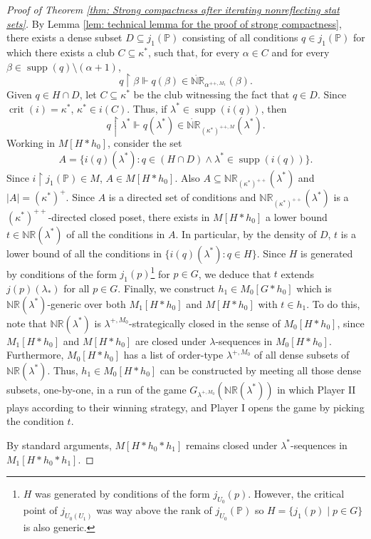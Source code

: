 \documentclass[11pt]{amsart}
\renewcommand{\restriction}{\mathbin\upharpoonright}    %
\theoremstyle{definition}
\newcounter{condition}
\theoremstyle{remark}
\newcommand\<{{<}}
\DeclareMathOperator{\supp}{supp}
\DeclareMathOperator{\crit}{crit}
\newcommand{\po}{\mathbb{P}}
\begin{document}
\begin{proof}[Proof of Theorem \ref{thm: Strong compactness after iterating nonreflecting stat sets}]
By Lemma \ref{lem: technical lemma for the proof of strong compactness}, there exists a dense subset $D\subseteq j_1(\po)$ consisting of all conditions $q\in j_1(\po)$ for which there exists a club $C\subseteq \kappa^*$, such that, for every $\alpha\in C$ and for every $\beta\in \supp(q)\setminus ( \alpha+1 )$,
$$ q\restriction \beta \Vdash q(\beta)\in \dot{\mathbb{NR}}_{\alpha^{++, M_1}}(\beta). $$
Given $q\in H\cap D$, let $C\subseteq \kappa^*$ be the club witnessing the fact that $q\in D$. Since $\crit(i) = \kappa^*$, $\kappa^*\in i(C)$. Thus, if $\lambda^*\in \supp(i(q))$, then 
$$q\restriction \lambda^* \Vdash q(\lambda^*)\in \dot{\mathbb{NR}}_{(\kappa^*)^{++, M}}(\lambda^*).$$
Working in $M[H*h_0]$, consider the set $$A = \{ i(q)(\lambda^*) \colon q\in (H\cap D) \land \lambda^*\in \supp(i(q)) \}.$$ Since $i\restriction j_1(\po)\in M$, $A\in M[H*h_0]$. Also $A\subseteq \mathbb{NR}_{(\kappa^*)^{++}}(\lambda^*)$ and $|A| = (\kappa^*)^+$. Since $A$ is a directed set of conditions and $\mathbb{NR}_{(\kappa^{*})^{++}}(\lambda^*)$ is a $(\kappa^{*})^{++}$-directed closed poset, there exists in $M[H*h_0]$ a lower bound $t\in \mathbb{NR}(\lambda^*)$ of all the conditions in $A$. In particular, by the density of $D$, $t$ is a lower bound of all the conditions in $\{ i(q)(\lambda^*) \colon q\in H \}$. Since $H$ is generated by  conditions of the form $j_1(p)$\footnote{$H$ was generated by conditions of the form $j_{U_0}(p)$. However, the critical point of $j_{U_0(U_1)}$ was way above the rank of $j_{U_0}(\mathbb{P})$ so $H=\{j_1(p)\mid p\in G\}$ is also generic.} for $p\in G$, we deduce that $t$ extends $j(p)(\lambda_*)$ for all $p\in G$. Finally, we construct $h_1\in M_0[G*h_0]$ which is $\mathbb{NR}(\lambda^*)$-generic over both $M_1[H*h_0]$ and $M[H*h_0]$ with $t\in h_1$. To do this, note that $\mathbb{NR}(\lambda^*)$ is $\lambda^{+,M_0}$-strategically closed in the sense of $M_0[H*h_0]$, since $M_1[H*h_0]$ and $M[H*h_0]$ are closed under $\lambda$-sequences in $M_0[H*h_0]$. Furthermore, $M_0[H*h_0]$ has a list of order-type $\lambda^{+,M_0}$ of all dense subsets of $\mathbb{NR}(\lambda^*)$. Thus, $h_1\in M_0[H*h_0]$ can be constructed by meeting all those dense subsets, one-by-one, in a run of the game $G_{\lambda^{+,M_0}}(\mathbb{NR}(\lambda^*))$ in which Player II plays according to their winning strategy, and Player I opens the game by picking the condition $t$. 

By standard arguments, $M[H*h_0*h_1]$ remains closed under $\lambda^*$-sequences in $M_1[H*h_0*h_1]$.

\smallskip



\end{proof}
\end{document}
